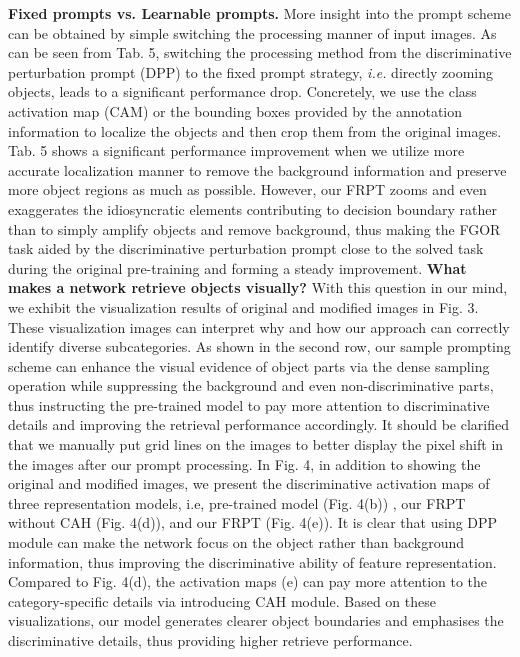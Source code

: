 \documentclass[letterpaper]{article} %
\begin{document}
\textbf{Fixed prompts vs. Learnable prompts.} More insight into the prompt scheme can be obtained by simple switching the processing manner of input images. As can be seen from Tab. 5, switching the processing method from the discriminative perturbation prompt (DPP) to the fixed prompt strategy, \textit{i.e.} directly zooming objects, leads to a significant performance drop.
\vspace{-3.36mm}
Concretely, we use the class activation map (CAM) or the bounding boxes provided by the annotation information to localize the objects and then crop them from the original images. Tab. 5 shows a significant performance improvement when we utilize more accurate localization manner to remove the background information and preserve more object regions as much as possible. However, our FRPT zooms and even exaggerates the idiosyncratic elements contributing to decision boundary rather than to simply amplify objects and remove background, thus making the FGOR task aided by the discriminative perturbation prompt close to the solved task during the original pre-training and forming a steady improvement.  \textbf{What makes a network retrieve objects visually?} With this question in our mind, we exhibit the visualization results of original and modified images in Fig. 3. These visualization images can interpret why and how our approach can correctly identify diverse subcategories. As shown in the second row, our sample prompting scheme can enhance the visual evidence of object parts via the dense sampling operation while suppressing the background and even non-discriminative parts, thus instructing the pre-trained model to pay more attention to discriminative details and improving the retrieval performance accordingly.
It should be clarified that we manually put grid lines on the images to better display the pixel shift in the images after our prompt processing. In Fig. 4, in addition to showing the original and modified images, we present the discriminative activation maps of three representation models, i.e, pre-trained model (Fig. 4(b)) , our FRPT without CAH (Fig. 4(d)), and our FRPT (Fig. 4(e)). It is clear that using DPP module can make the network focus on the object rather than background information, thus improving the discriminative ability of feature representation. Compared to Fig. 4(d), the activation maps (e) can pay more attention to the category-specific details via introducing CAH module. Based on these visualizations, our model generates clearer object boundaries and emphasises the discriminative details, thus providing higher retrieve performance.
\end{document}
